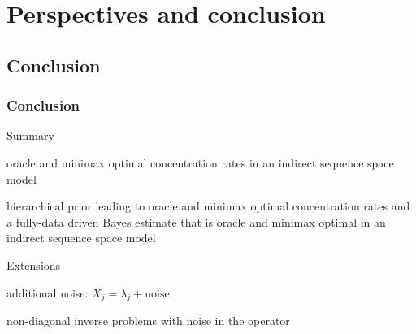 \documentclass[english,fleqn]{beamer}%
\renewcommand{\1}{\mathbbm{1}}
\newcommand{\rudicolor}{\color{wfugold}}%
\theoremstyle{mydefi}
\theoremstyle{mynote}
\begin{document}
\section{Perspectives and conclusion}

\subsection{Conclusion}
\begin{frame}
  \frametitle{Conclusion}
  \begin{rudiListeS}[\setListeL{5ex}{0ex}{5ex}{5ex}] 
  \item Summary
  \begin{rudiListeB}[\setListeL{1ex}{2ex}{2ex}{3ex}] 
\item  {\rudicolor oracle} and {\rudicolor minimax} optimal concentration rates in an indirect sequence space
model
  \item<2-> hierarchical prior leading to {\rudicolor oracle} and {\rudicolor minimax} optimal concentration
    rates and a fully-data driven Bayes estimate that is {\rudicolor
      oracle} and  {\rudicolor minimax} optimal in an indirect sequence space
model
\end{rudiListeB}
\item<3-> Extensions
  \begin{rudiListeB}[\setListeL{1ex}{2ex}{2ex}{3ex}] 
\item<3-> additional noise: $X_j=\lambda_j+\text{noise}$
\item<4-> non-diagonal inverse problems with noise in the operator
\end{rudiListeB}
\end{rudiListeS}
\end{frame}
\end{document}
